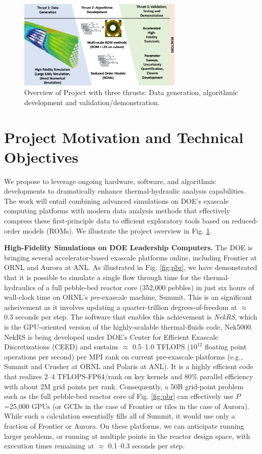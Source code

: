 \begin{figure}[t!] \centering
    \includegraphics[width = 0.70\textwidth]{figs/overview.png}
    \caption{Overview of Project with three thrusts: Data generation,
             algorithmic development and validation/demonstration.  \label{fig:sum}}
\end{figure}


\section{Project Motivation and Technical Objectives}

We propose to leverage ongoing hardware, software, and algorithmic developments
to dramatically enhance thermal-hydraulic analysis capabilities.  The work will
entail combining advanced simulations on DOE's exascale computing platforms
with modern data analysis methods that effectively compress these
first-principle data to efficient exploratory tools based on reduced-order
models (ROMs).
We illustrate the project overview in Fig. \ref{fig:sum}.

\noindent
{\bf High-Fidelity Simulations on DOE Leadership Computers.}
The DOE is bringing several accelerator-based exascale platforms online,
including Frontier at ORNL and Aurora at ANL.  As illustrated in Fig.
\ref{fig:pbr}, we have demonstrated that it is possible to simulate a single
flow through time for the thermal-hydraulics of a full pebble-bed reactor core
(352,000 pebbles) in just six hours of wall-clock time on ORNL's {\em
pre}-exascale machine, Summit.   This is an significant acheivement as it
involves updating a quarter-trillion degrees-of-freedom at $\approx$ 0.3
seconds per step.  The software that enables this achievement is {\em NekRS},
which is the GPU-oriented version of the highly-scalable thermal-fluids code,
Nek5000.  NekRS is being developed under DOE's Center for Efficient Exascale
Discretizations (CEED) and sustains $\approx$ 0.5--1.0 TFLOPS ($10^{12}$
floating point operations per second) per MPI rank on current pre-exascale
platforms (e.g., Summit and Crusher at ORNL and Polaris at ANL).  It is a
highly efficient code that realizes 2--4 TFLOPS-FP64/rank on key kernels and
80\% parallel efficiency with about 2M grid points per rank.  Consequently, a
50B grid-point problem such as the full pebble-bed reactor core of Fig.
\ref{fig:pbr} can effectively use $P$=25,000 GPUs (or GCDs in the case of
Frontier or tiles in the case of Aurora).  While such a calculation essentially
fills all of Summit, it would use only a fraction of Frontier or Aurora.  On
these platforms, we can anticipate running larger problems, or running at
multiple points in the reactor design space, with execution times 
remaining at $\approx$ 0.1--0.3 seconds per step.

